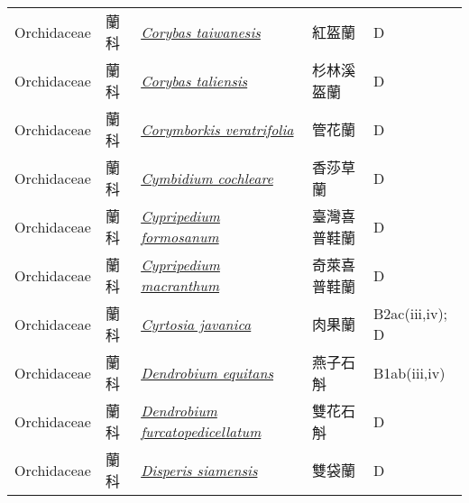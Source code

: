 {\begin{longtable}{p{2.5cm}p{2.5cm}p{4.5cm}p{2.5cm}p{3cm}}
    Orchidaceae & 蘭科 & \href{http://www.theplantlist.org/tpl1.1/search?q=Corybas+taiwanesis}{\textit{Corybas taiwanesis} } & 紅盔蘭 & D \index{Corybas@\textit{Corybas}!taiwanesis@\textit{taiwanesis}}  \index{紅盔蘭} \\
    Orchidaceae & 蘭科 & \href{http://www.theplantlist.org/tpl1.1/search?q=Corybas+taliensis}{\textit{Corybas taliensis} } & 杉林溪盔蘭 & D \index{Corybas@\textit{Corybas}!taliensis@\textit{taliensis}}  \index{杉林溪盔蘭} \\
    Orchidaceae & 蘭科 & \href{http://www.theplantlist.org/tpl1.1/search?q=Corymborkis+veratrifolia}{\textit{Corymborkis veratrifolia} } & 管花蘭 & D \index{Corymborkis@\textit{Corymborkis}!veratrifolia@\textit{veratrifolia}}  \index{管花蘭} \\
    Orchidaceae & 蘭科 & \href{http://www.theplantlist.org/tpl1.1/search?q=Cymbidium+cochleare}{\textit{Cymbidium cochleare} } & 香莎草蘭 & D \index{Cymbidium@\textit{Cymbidium}!cochleare@\textit{cochleare}}  \index{香莎草蘭} \\
    Orchidaceae & 蘭科 & \href{http://www.theplantlist.org/tpl1.1/search?q=Cypripedium+formosanum}{\textit{Cypripedium formosanum} } & 臺灣喜普鞋蘭 & D \index{Cypripedium@\textit{Cypripedium}!formosanum@\textit{formosanum}}  \index{臺灣喜普鞋蘭} \\
    Orchidaceae & 蘭科 & \href{http://www.theplantlist.org/tpl1.1/search?q=Cypripedium+macranthum}{\textit{Cypripedium macranthum} } & 奇萊喜普鞋蘭 & D \index{Cypripedium@\textit{Cypripedium}!macranthum@\textit{macranthum}}  \index{奇萊喜普鞋蘭} \\
    Orchidaceae & 蘭科 & \href{http://www.theplantlist.org/tpl1.1/search?q=Cyrtosia+javanica}{\textit{Cyrtosia javanica} } & 肉果蘭 & B2ac(iii,iv); D \index{Cyrtosia@\textit{Cyrtosia}!javanica@\textit{javanica}}  \index{肉果蘭} \\
    Orchidaceae & 蘭科 & \href{http://www.theplantlist.org/tpl1.1/search?q=Dendrobium+equitans}{\textit{Dendrobium equitans} } & 燕子石斛 & B1ab(iii,iv) \index{Dendrobium@\textit{Dendrobium}!equitans@\textit{equitans}}  \index{燕子石斛} \\
    Orchidaceae & 蘭科 & \href{http://www.theplantlist.org/tpl1.1/search?q=Dendrobium+furcatopedicellatum}{\textit{Dendrobium furcatopedicellatum} } & 雙花石斛 & D \index{Dendrobium@\textit{Dendrobium}!furcatopedicellatum@\textit{furcatopedicellatum}}  \index{雙花石斛} \\
    Orchidaceae & 蘭科 & \href{http://www.theplantlist.org/tpl1.1/search?q=Disperis+siamensis}{\textit{Disperis siamensis} } & 雙袋蘭 & D \index{Disperis@\textit{Disperis}!siamensis@\textit{siamensis}}  \index{雙袋蘭} \\

\end{longtable}}
